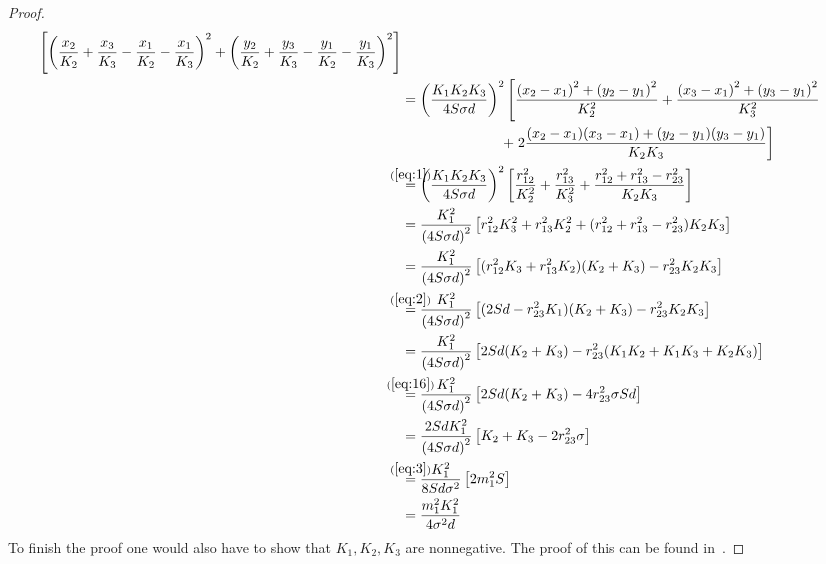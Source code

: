 \begin{proof}
\begin{align}
    \left[ {\left( \frac{x_2}{K_2} + \frac{x_3}{K_3} - \frac{x_1}{K_2} -
    \frac{x_1}{K_3} \right)}^2 + {\left( \frac{y_2}{K_2} + \frac{y_3}{K_3} -
    \frac{y_1}{K_2} - \frac{y_1}{K_3} \right)}^2 \right] \\
  &= {\left( \frac{K_1 K_2 K_3}{4 S \sigma d} \right)}^2
    \left[ \frac{{(x_2 - x_1)}^2 + {(y_2 - y_1)}^2}{K_2^2} +
    \frac{{(x_3 - x_1)}^2 + {(y_3 - y_1)}^2}{K_3^2} \right. \\
  &\hspace{7em} \left. + \; 2 \frac{(x_2 - x_1)(x_3 - x_1) +
    (y_2 - y_1)(y_3 - y_1)}{K_2 K_3} \right] \\
  &\stackrel{\mathclap{(\ref{eq:1})}}{=}
    {\left( \frac{K_1 K_2 K_3}{4 S \sigma d} \right)}^2
    \left[ \frac{r_{12}^2}{K_2^2} + \frac{r_{13}^2}{K_3^2} +
    \frac{r_{12}^2 + r_{13}^2 - r_{23}^2}{K_2 K_3} \right] \\
  &= \frac{K_1^2}{{(4 S \sigma d)}^2}
    \left[ r_{12}^2 K_3^2 + r_{13}^2 K_2^2 +
    (r_{12}^2 + r_{13}^2 - r_{23}^2) K_2 K_3 \right] \\
  &= \frac{K_1^2}{{(4 S \sigma d)}^2}
    \left[ (r_{12}^2 K_3 + r_{13}^2 K_2) (K_2 + K_3) -
    r_{23}^2 K_2 K_3 \right] \\
  &\stackrel{\mathclap{(\ref{eq:2})}}{=}
    \frac{K_1^2}{{(4 S \sigma d)}^2}
    \left[ (2 S d - r_{23}^2 K_1) (K_2 + K_3) - r_{23}^2 K_2 K_3 \right] \\
  &= \frac{K_1^2}{{(4 S \sigma d)}^2}
    \left[ 2 S d (K_2 + K_3) - r_{23}^2 (K_1 K_2 + K_1 K_3 + K_2 K_3) \right] \\
  &\stackrel{\mathclap{(\ref{eq:16})}}{=}
    \frac{K_1^2}{{(4 S \sigma d)}^2}
    \left[ 2 S d (K_2 + K_3) - 4 r_{23}^2 \sigma S d \right] \\
  &= \frac{2 S d K_1^2}{{(4 S \sigma d)}^2}
    \left[ K_2 + K_3 - 2 r_{23}^2 \sigma \right] \\
  &\stackrel{\mathclap{(\ref{eq:3})}}{=}
    \frac{K_1^2}{8 S d \sigma^2}
    \left[ 2 m_1^2 S \right] \\
  &= \frac{m_1^2 K_1^2}{4 \sigma^2 d}
\end{align}
%
To finish the proof one would also have to show that $K_1, K_2, K_3$ are
nonnegative. The proof of this can be found in~\cite[p.~5-6]{uteshev2014}.


\end{proof}
